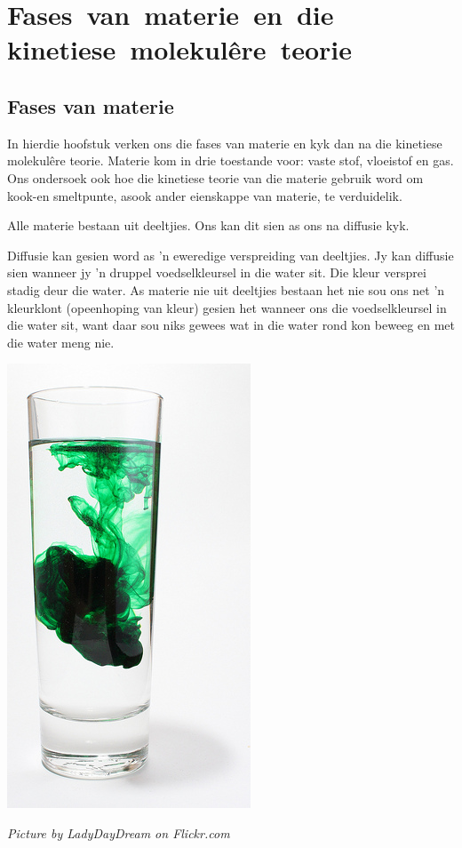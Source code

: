          \chapter{\mbox{Fases van materie en die} \mbox{kinetiese molekul\^{e}re teorie}}
\label{m38736*cid2}
            \section{Fases van materie}
            \nopagebreak

\label{m38736*id802341}In hierdie hoofstuk verken ons die fases van materie en kyk dan na die kinetiese molekul\^{e}re teorie. Materie kom in drie toestande voor: vaste stof, vloeistof en gas. Ons ondersoek ook hoe die kinetiese teorie van die materie gebruik word om kook-en smeltpunte, asook ander eienskappe van materie, te verduidelik.\par 
{}
\label{m38736*id324876121}Alle materie bestaan uit deeltjies. Ons kan dit sien as ons na diffusie kyk. \par
{} 
\begin{minipage}{.5\textwidth}
Diffusie kan gesien word as 'n eweredige verspreiding van deeltjies. Jy kan diffusie sien wanneer jy 'n druppel voedselkleursel in die water sit. Die kleur versprei stadig deur die water. As materie nie uit deeltjies bestaan het nie sou ons net 'n kleurklont (opeenhoping van kleur) gesien het wanneer ons die voedselkleursel in die water sit, want daar sou niks gewees wat in die water rond kon beweeg en met die water meng nie.
\end{minipage}
\begin{minipage}{.5\textwidth}
\begin{center}
 \includegraphics[height=.5\textwidth]{photos/diffusionby-LadyDayDream-flickr.jpg}\par
\textit{Picture by LadyDayDream on Flickr.com}
\end{center}
\end{minipage}

